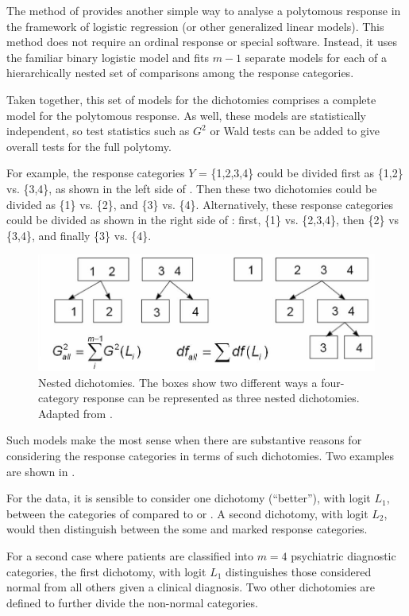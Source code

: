\documentclass[11pt]{book}\usepackage[]{graphicx}\usepackage[]{color}
\begin{document}
The method of 
provides another simple way to analyse a polytomous response in the 
framework of logistic regression (or other generalized linear models).
This method does not require an ordinal response or special
software. Instead, it uses the familiar binary logistic model
and fits $m-1$ separate models for each of a hierarchically nested set
of comparisons among the response categories. 

Taken together, this set of models for the dichotomies comprises a
complete model for the polytomous response.  As well, these models
are statistically independent, so test statistics such
as $G^2$ or Wald tests can be added to give overall tests for the
full polytomy.

For example, the response categories
$Y$ = \{1,2,3,4\} could be divided first as \{1,2\} vs. \{3,4\}, as shown in the
left side of .  Then these two
dichotomies could be divided as \{1\} vs. \{2\}, and \{3\} vs. \{4\}.
Alternatively, these response categories could be divided as shown in the
right side of : first, \{1\} vs.
\{2,3,4\}, then \{2\} vs \{3,4\}, and finally \{3\} vs. \{4\}.  
\begin{figure}[htb]
  \centering
  \includegraphics[width=.8\textwidth]{ch07/fig/nested2}
  \caption[Nested dichotomies]{Nested dichotomies.  The boxes show two different ways a four-category response can be represented as three nested dichotomies. Adapted from \citet{Fox:2008}.}\label{fig:nested2}
\end{figure}

Such models make the most sense when there are substantive reasons for considering 
the response categories in terms of such dichotomies. Two examples are shown in .
\begin{itemize*}
 \item For the  data, it is sensible to consider one dichotomy (``better''),
with logit $L_1$, 
between the categories of  compared to  or .
A second dichotomy, with logit $L_2$,
would then distinguish between the some and marked response categories.
 \item For a second case where patients are classified into $m=4$ 
 psychiatric diagnostic categories, the first dichotomy, with logit $L_1$
 distinguishes those considered normal from all others given a clinical
 diagnosis.  Two other dichotomies are defined to further divide the
 non-normal categories.
\end{itemize*}
\end{document}

